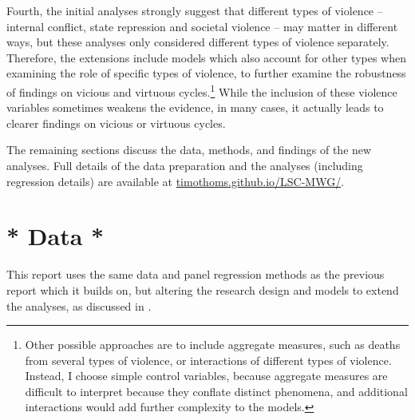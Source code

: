 \documentclass[12pt]{article}
\begin{document}
Fourth, the initial analyses strongly suggest that different types of violence -- internal conflict, state repression and societal violence -- may matter in different ways, but these analyses only considered different types of violence separately. Therefore, the extensions include models which also account for other types when examining the role of specific types of violence, to further examine the robustness of findings on vicious and virtuous cycles.\footnote{Other possible approaches are to include aggregate measures, such as deaths from several types of violence, or interactions of different types of violence. Instead,  I choose simple control variables, because aggregate measures are difficult to interpret because they conflate distinct phenomena, and additional interactions would add further complexity to the models.} While the inclusion of these violence variables sometimes weakens the evidence, in many cases, it actually leads to clearer findings on vicious or virtuous cycles.

The remaining sections discuss the data, methods, and findings of the new analyses. Full details of the data preparation and the analyses (including regression details) are available at \href{https://timothoms.github.io/LSC-MWG/}{timothoms.github.io/LSC-MWG/}.

\section{* Data *}
\label{data}

This report uses the same data and panel regression methods as the previous report which it builds on, but altering the research design and models to extend the analyses, as discussed in .
\end{document}
